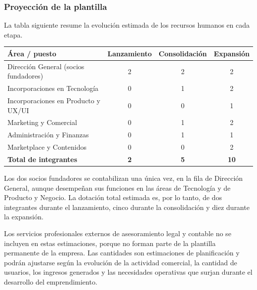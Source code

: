 \subsubsection{Proyección de la plantilla}
La tabla siguiente resume la evolución estimada de los recursos humanos en cada etapa.

\begin{center}
\small
\begin{tabularx}{\textwidth}{|X|c|c|c|}
\hline
\textbf{Área / puesto} & \textbf{Lanzamiento} & \textbf{Consolidación} & \textbf{Expansión}\\ \hline
Dirección General (socios fundadores) & 2 & 2 & 2\\ \hline
Incorporaciones en Tecnología & 0 & 1 & 2\\ \hline
Incorporaciones en Producto y UX/UI & 0 & 0 & 1\\ \hline
Marketing y Comercial & 0 & 1 & 2\\ \hline
Administración y Finanzas & 0 & 1 & 1\\ \hline
Marketplace y Contenidos & 0 & 0 & 2\\ \hline
\textbf{Total de integrantes} & \textbf{2} & \textbf{5} & \textbf{10}\\ \hline
\end{tabularx}
\end{center}

Los dos socios fundadores se contabilizan una única vez, en la fila de Dirección General, aunque desempeñan sus funciones en las áreas de Tecnología y de Producto y Negocio. La dotación total estimada es, por lo tanto, de dos integrantes durante el lanzamiento, cinco durante la consolidación y diez durante la expansión.

Los servicios profesionales externos de asesoramiento legal y contable no se incluyen en estas estimaciones, porque no forman parte de la plantilla permanente de la empresa. Las cantidades son estimaciones de planificación y podrán ajustarse según la evolución de la actividad comercial, la cantidad de usuarios, los ingresos generados y las necesidades operativas que surjan durante el desarrollo del emprendimiento.
